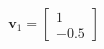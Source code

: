 \documentclass[preview]{standalone}
\begin{document}
\begin{align*}
\mathbf{v}_1=\begin{bmatrix} 1 \\ -0.5 \end{bmatrix}
\end{align*}
\end{document}

